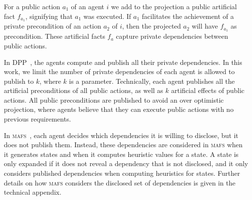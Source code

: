 \documentclass{article}
\newcommand{\mafs}{\textsc {mafs}\xspace}
\newcommand{\dpp}{\textsc {DPP}\xspace}
\theoremstyle{remark}
\begin{document}
For a public action $a_1$ of an agent $i$ we add to the projection a public artificial fact $f_{a_1}$, signifying that $a_1$ was executed. If $a_1$ facilitates the achievement of a private precondition of an action $a_2$ of $i$, then the projected $a_2$ will have $f_{a_1}$ as precondition. These artificial facts $f_a$ capture private dependencies between public actions.

In \dpp~\cite{maliah2016projections}, the agents compute and publish all their private dependencies. In this work, we limit the number of private dependencies of each agent is allowed to publish to $k$, where $k$ is a parameter. 
Technically, each agent publishes all the artificial preconditions of all public actions, as well as $k$ artificial effects of public actions. 
All public preconditions are published to avoid an over optimistic projection, where agents believe that they can execute public actions with no previous requirements.


In \mafs~\cite{nissim2014distributed}, each agent decides which dependencies it is willing to disclose, but it does not publish them. 
Instead, these dependencies are considered in \mafs when it generates states and when it computes heuristic values for a state. 
A state is only expanded if it does not reveal a dependency that is not disclosed, and it only considers published dependencies when computing heuristics for states. Further details on how \mafs considers the disclosed set of dependencies is given in the technical appendix. 
\end{document}
